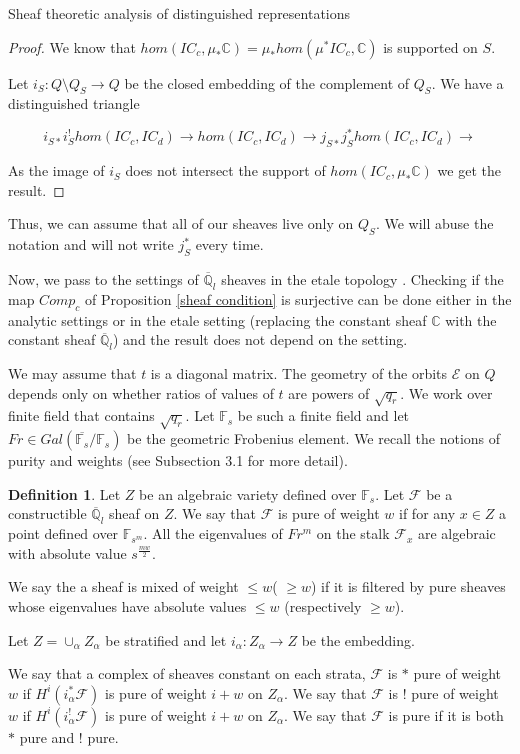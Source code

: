 \documentclass[12pt]{article}
\newcommand{\F}{\mathbb{F}}
\newcommand{\C}{\mathbb{C}}
\newcommand{\Q}{\mathbb{Q}}
\newcommand{\<}{\langle}
\renewcommand{\>}{\rangle}
\theoremstyle{plain}
\theoremstyle{definition}
\newtheorem{defn}[theorem]{Definition}
\begin{document}
\begin{section}{Sheaf theoretic analysis of distinguished representations}
\begin{proof}
    We know that $hom(IC_c,\mu_*\C)=\mu_*hom(\mu^*IC_c,\C)$ is supported on $S$. 
    
    Let $i_S:Q\setminus Q_S\rightarrow Q$ be the closed embedding of the complement of $Q_S$. We have a distinguished triangle 

     $$i_{S*}i_S^!hom(IC_c,IC_d)\rightarrow hom(IC_c,IC_d)\rightarrow j_{S*}j_S^*hom(IC_c,IC_d)\rightarrow$$
    
    As the image of $i_S$ does not intersect the support of $hom(IC_c,\mu_*\C)$ we get the result. 
\end{proof}

Thus, we can assume that all of our sheaves live only on $Q_S$. We will abuse the notation and will not write $j_S^*$ every time.



Now, we pass to the settings of $\overline{\Q}_l$ sheaves in the etale topology \cite{BBD}. Checking if the map $Comp_c$ of Proposition \ref{sheaf condition} is surjective can be done either in the analytic settings or in the etale setting (replacing the constant sheaf $\C$ with the constant sheaf $\overline{\Q}_l$) and the result does not depend on the setting. 

We may assume that $t$ is a diagonal matrix. The geometry of the orbits $\mathcal{E}$ on $Q$ depends only on whether ratios of values of $t$ are powers of $\sqrt{q_r}$. We work over finite field that contains $\sqrt{q_r}$. Let $\F_s$ be such a finite field and let $Fr\in Gal(\overline{\F_s}/\F_s)$ be the geometric Frobenius element. We recall the notions of purity and weights (see \cite{cataldo} Subsection 3.1 for more detail).

\begin{defn}
    Let $Z$ be an algebraic variety defined over $\F_s$. Let $\mathcal{F}$ be a constructible $\overline{\Q}_l$ sheaf on $Z$. We say that $\mathcal{F}$ is pure of weight $w$ if for any $x\in Z$ a point defined over $\F_{s^m}$. All the eigenvalues of $Fr^m$ on the stalk  $\mathcal{F}_x$ are algebraic with absolute value $s^\frac{mw}{2}$.

    We say the a sheaf is mixed of weight $\leq w$( $\geq w$) if it is filtered by pure sheaves whose eigenvalues have absolute values $\leq w$ (respectively $\geq w$).  

    Let $Z=\cup_\alpha Z_\alpha$ be stratified and let $i_\alpha:Z_\alpha\rightarrow Z$ be the embedding.
    
    We say that a complex of sheaves constant on each strata, $\mathcal{F}$ is $*$ pure of weight $w$ if $H^i(i^*_\alpha\mathcal{F})$ is pure of weight $i+w$ on $Z_\alpha$. We say that $\mathcal{F}$ is $!$ pure of weight $w$ if $H^i(i^!_\alpha\mathcal{F})$ is pure of weight $i+w$ on $Z_\alpha$. We say that $\mathcal{F}$ is pure if it is both $*$ pure and $!$ pure. 
\end{defn}


\end{section}
\end{document}
